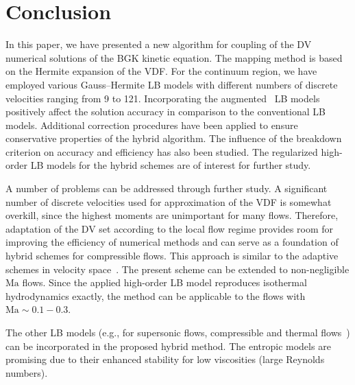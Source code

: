 \documentclass{elsarticle} %
\newcommand{\Ma}{\mathrm{Ma}}
\begin{document}
\section{Conclusion}\label{sec:summary}

In this paper, we have presented a new algorithm for coupling of the DV numerical solutions of the BGK kinetic equation.
The mapping method is based on the Hermite expansion of the VDF.
For the continuum region, we have employed various Gauss--Hermite LB models with different numbers of discrete velocities ranging from 9 to 121.
Incorporating the augmented~\cite{Feuchter2016} LB models %
positively affect the solution accuracy in comparison to the conventional LB models.
Additional correction procedures have been applied to ensure conservative properties of the hybrid algorithm.
The influence of the breakdown criterion on accuracy and efficiency has also been studied.
The regularized high-order LB models for the hybrid schemes are of interest for further study.

A number of problems can be addressed through further study.
A significant number of discrete velocities used for approximation of the VDF is somewhat overkill,
since the highest moments are unimportant for many flows.
Therefore, adaptation of the DV set according to the local flow regime provides room for improving the efficiency of numerical methods
and can serve as a foundation of hybrid schemes for compressible flows.
This approach is similar to the adaptive schemes in velocity space~\cite{Aristov1977, Kolobov2013, Baranger2014}.
The present scheme can be extended to non-negligible $\Ma$ flows. Since the applied high-order LB model reproduces isothermal hydrodynamics exactly, the method can be applicable to the flows with $\Ma \sim 0.1-0.3$.

The other LB models (e.g., for supersonic flows, compressible and thermal flows~\cite{Chen2010, Frapolli2015, Frapolli2016})
can be incorporated in the proposed hybrid method.
The entropic models are promising due to their enhanced stability for low viscosities (large Reynolds numbers).

\end{document}
